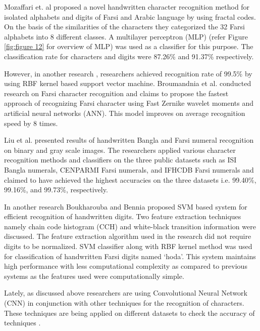 \documentclass{article}
\begin{document}
Mozaffari et. al \cite{mozaffari2004recognition} proposed a novel handwritten character recognition method for isolated alphabets and digits of Farsi and Arabic language by using fractal codes. On the basis of the similarities of the characters they categorized the 32 Farsi alphabets into 8 different classes. A multilayer perceptron (MLP) (refer Figure \ref{fig:figure 12} for overview of MLP)  was used as a classifier for this purpose. The classification rate for characters and digits were 87.26\% and 91.37\% respectively. 


However, in another research \cite{soltanzadeh2004recognition}, researchers achieved recognition rate of 99.5\% by using RBF kernel based support vector machine. Broumandnia et al. \cite{broumandnia2007fast} conducted research on Farsi character recognition and claims to propose the fastest approach of recognizing Farsi character using Fast Zernike wavelet moments and artificial neural networks (ANN). This model improves on average recognition speed by 8 times. 



Liu et al. \cite{liu2009new} presented results of handwritten Bangla and Farsi numeral recognition on binary and gray scale images. The researchers applied various character recognition methods and classifiers on the three public datasets such as ISI Bangla numerals, CENPARMI Farsi numerals, and IFHCDB Farsi numerals and claimed to have achieved the highest accuracies on the three datasets i.e. 99.40\%, 99.16\%, and 99.73\%, respectively. 

In another research Boukharouba and Bennia \cite{boukharouba2017novel} proposed SVM based system for efficient recognition of handwritten digits. Two feature extraction techniques namely chain code histogram (CCH) \cite{cch} and white-black transition information were discussed. The feature extraction algorithm used in the research did not require digits to be normalized. SVM classifier along with RBF kernel method was used for classification of handwritten Farsi digits named ‘hoda’. This system maintains high performance with less computational complexity as compared to previous systems as the features used were computationally simple.

Lately, as discussed above researchers are using Convolutional Neural Network (CNN) in conjunction with other techniques for the recognition of characters. These techniques are being applied on different datasets to check the accuracy of techniques \cite{sokar2018generic, akbari2018novel, ghasemi2018persian, alizadehashraf2017persian}.
\end{document}
